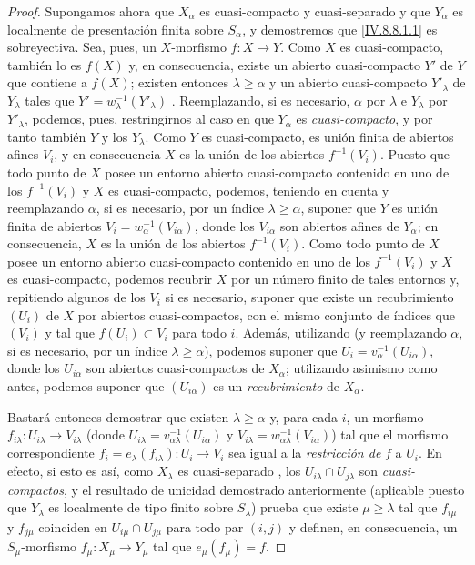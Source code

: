 \begin{proof}
Supongamos ahora que $X_\alpha$ es cuasi-compacto y cuasi-separado y que $Y_\alpha$ es localmente de presentación finita sobre $S_\alpha$, y demostremos que \eqref{IV.8.8.1.1} es sobreyectiva.
Sea, pues, un $X$-morfismo $f:X\to Y$.
Como $X$ es cuasi-compacto, también lo es
$f(X)$ y, en consecuencia, existe un abierto cuasi-compacto $Y'$ de $Y$ que contiene a $f(X)$; existen entonces $\lambda\geqslant\alpha$ y un abierto cuasi-compacto $Y'_\lambda$ de $Y_\lambda$ tales que $Y'=w_\lambda^{-1}(Y'_\lambda)$ .
Reemplazando, si es necesario, $\alpha$ por $\lambda$ e $Y_\lambda$ por $Y'_\lambda$, podemos, pues, restringirnos al caso en que $Y_\alpha$ es \emph{cuasi-compacto}, y por tanto también $Y$ y los $Y_\lambda$.
Como $Y$ es cuasi-compacto, es unión finita de abiertos afines $V_i$, y en consecuencia $X$ es la unión de los abiertos $f^{-1}(V_i)$. Puesto que todo punto de $X$ posee un entorno abierto cuasi-compacto contenido en uno de los $f^{-1}(V_i)$ y $X$ es cuasi-compacto, podemos, teniendo en cuenta  y reemplazando $\alpha$, si es necesario, por un índice $\lambda\geqslant\alpha$, suponer que $Y$ es unión finita de abiertos $V_i=w_\alpha^{-1}(V_{i\alpha})$, donde los $V_{i\alpha}$ son abiertos afines de $Y_\alpha$; en consecuencia, $X$ es la unión de los abiertos $f^{-1}(V_i)$. Como todo punto de $X$ posee un entorno abierto cuasi-compacto contenido en uno de los $f^{-1}(V_i)$ y $X$ es cuasi-compacto, podemos recubrir $X$ por un número finito de tales entornos y, repitiendo algunos de los $V_i$ si es necesario, suponer que existe un recubrimiento $(U_i)$ de $X$ por abiertos cuasi-compactos, con el mismo conjunto de índices que $(V_i)$ y tal que $f(U_i)\subset V_i$ para todo $i$. Además, utilizando  (y reemplazando $\alpha$, si es necesario, por un índice $\lambda\geqslant\alpha$), podemos suponer que $U_i=v_\alpha^{-1}(U_{i\alpha})$, donde los $U_{i\alpha}$ son abiertos cuasi-compactos de $X_\alpha$; utilizando asimismo  como antes, podemos suponer que $(U_{i\alpha})$ es un \emph{recubrimiento} de $X_\alpha$.

Bastará entonces demostrar que existen $\lambda\geqslant\alpha$ y, para cada $i$, un morfismo $f_{i\lambda}:U_{i\lambda}\to V_{i\lambda}$ (donde $U_{i\lambda}=v_{\alpha\lambda}^{-1}(U_{i\alpha})$ y $V_{i\lambda}=w_{\alpha\lambda}^{-1}(V_{i\alpha})$) tal que el morfismo correspondiente $f_i=e_\lambda(f_{i\lambda}):U_i\to V_i$ sea igual a la \emph{restricción de} $f$ a $U_i$.
En efecto, si esto es así, como $X_\lambda$ es cuasi-separado , los $U_{i\lambda}\cap U_{j\lambda}$ son \emph{cuasi-compactos}, y el resultado de unicidad demostrado anteriormente (aplicable puesto que $Y_\lambda$ es localmente de tipo finito sobre $S_\lambda$) prueba que existe $\mu\geqslant\lambda$ tal que $f_{i\mu}$ y $f_{j\mu}$ coinciden en $U_{i\mu}\cap U_{j\mu}$ para todo par $(i,j)$ y definen, en consecuencia, un $S_\mu$-morfismo $f_\mu:X_\mu\to Y_\mu$ tal que $e_\mu(f_\mu)=f$.


\end{proof}
